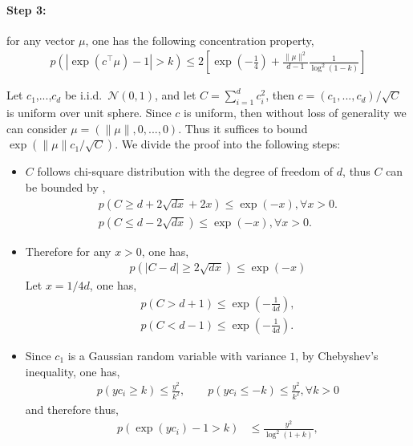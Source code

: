 \documentclass{article} \usepackage{acl2017,times}
\newenvironment{proof}[1][Proof]{\begin{trivlist}
\item[\hskip \labelsep {\bfseries #1}]}{\end{trivlist}}
\begin{document}
\paragraph{Step 3:} for any vector $\mu$, one has the following concentration property,
\begin{align}
    p\left(|\exp\left(c^{\top}\mu\right) - 1| > k\right) \le 2\left[\exp\left(-\frac{1}{4}\right) + \frac{\|\mu\|^2}{d-1}\frac{1}{\log^2(1-k)}\right] \label{eq:concentrate}
\end{align}
\begin{proof}
    Let $c_1$,...,$c_d$ be i.i.d.\ $\mathcal{N}(0, 1)$, and let $C = \sum_{i=1}^d c_i^2$, then $c = (c_1,...,c_d) / \sqrt{C}$ is uniform over unit sphere. Since $c$ is uniform, then without loss of generality we can consider  $\mu = (\|\mu\|, 0, ..., 0)$. Thus it suffices to bound $\exp\left(\|\mu\|c_1 / \sqrt{C}\right)$. We divide the proof into the following steps:
\begin{itemize}
\item $C$ follows chi-square distribution with the degree of freedom of $d$, thus $C$ can be bounded by \citep{laurent2000adaptive},
    \begin{align}
        p(C \ge d + 2\sqrt{dx} + 2x) \le  \exp(-x), \forall x > 0. \label{eq:c-bound-upper} \\
        p(C \le d - 2\sqrt{dx}) \le \exp(-x), \forall x>0. \label{eq:c-bound-lower}
    \end{align}
    \item Therefore for any $x>0$, one has,
    \begin{align*}
        p\left(|C - d| \ge 2\sqrt{dx} \right) \le \exp(-x)
    \end{align*}
   Let $x = 1/4d$, one has,
   \begin{align*}
    p(C > d+1) \le \exp\left(-\frac{1}{4d}\right), \\
    p(C < d-1) \le \exp\left(-\frac{1}{4d}\right).
   \end{align*}
    \item Since $c_1$ is a Gaussian random variable with variance $1$, by Chebyshev's inequality, one has,
    \begin{align*}
        p\left(yc_i \ge k\right) \le \frac{y^2}{k^2}, \qquad p\left(yc_i \le -k\right) \le \frac{y^2}{k^2}, \forall k > 0
    \end{align*}
    and therefore thus,
    \begin{align*}
        p(\exp(yc_i) -1 > k) &\le \frac{y^2}{\log^2(1+k)}, \\

\end{align*}
\end{itemize}
\end{proof}
\end{document}
